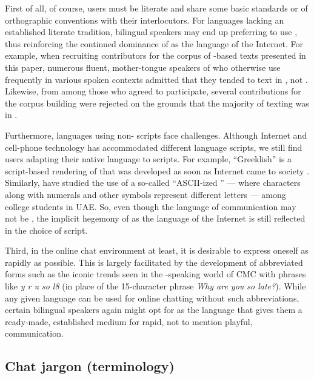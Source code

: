 \documentclass[output=paper,newtxmath,modfonts,nonflat,hidelinks]{langsci/langscibook}
\begin{document}
First of all, of course, users must be literate and share some basic standards or  of orthographic conventions with their interlocutors. For languages lacking an established literate tradition, bilingual speakers may end up preferring to use , thus reinforcing the continued dominance of  as the language of the Internet. For example, when recruiting contributors for the corpus of -based texts presented in this paper, numerous fluent, mother-tongue speakers of  who otherwise use  frequently in various spoken contexts admitted that they tended to text in , not . Likewise, from among those who agreed to participate, several contributions for the corpus building were rejected on the grounds that the majority of texting was in . 

Furthermore, languages using non- scripts face challenges. Although Internet and cell-phone technology has accommodated different language scripts, we still find users adapting their native language to  scripts. For example, “Greeklish” is a  script-based rendering of  that was developed as soon as Internet came to  society \citep{androutsopoulos2012}. Similarly, \citet{palfreyman2007} have studied the use of a so-called “ASCII-ized ” — where  characters along with numerals and other symbols represent different  letters — among college students in UAE. So, even though the language of communication may not be , the implicit hegemony of  as the language of the Internet is still reflected in the choice of script. 

\largerpage 
Third, in the online chat environment at least, it is desirable to express oneself as rapidly as possible. This is largely facilitated by the development of abbreviated forms such as the iconic trends seen in the -speaking world of CMC with phrases like \textit{y r u so l8} (in place of the 15-character phrase \textit{Why are you so late?}). While any given language can be used for online chatting without such abbreviations, certain bilingual speakers again might opt for  as the language that gives them a ready-made, established medium for rapid, not to mention playful, communication. 

\subsection{Chat jargon (terminology)}
\end{document}
